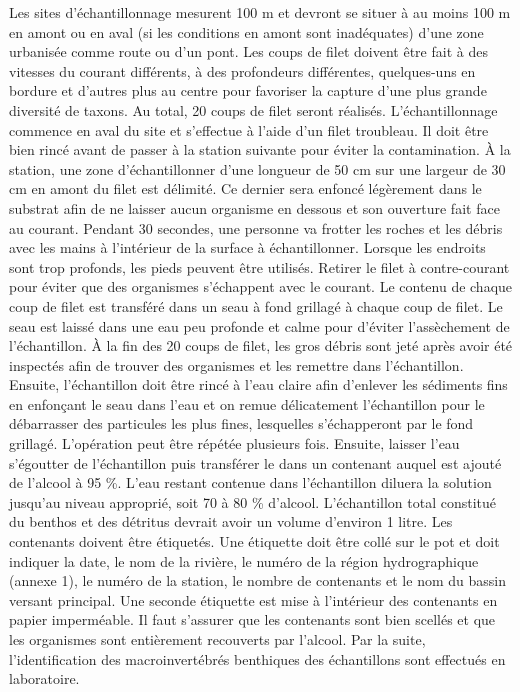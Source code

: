 \documentclass[]{glossa}
\begin{document}
Les sites d'échantillonnage mesurent 100 m et devront se situer à au
moins 100 m en amont ou en aval (si les conditions en amont sont
inadéquates) d'une zone urbanisée comme route ou d'un pont. Les coups de
filet doivent être fait à des vitesses du courant différents, à des
profondeurs différentes, quelques-uns en bordure et d'autres plus au
centre pour favoriser la capture d'une plus grande diversité de taxons.
Au total, 20 coups de filet seront réalisés. L'échantillonnage commence
en aval du site et s'effectue à l'aide d'un filet troubleau. Il doit
être bien rincé avant de passer à la station suivante pour éviter la
contamination. À la station, une zone d'échantillonner d'une longueur de
50 cm sur une largeur de 30 cm en amont du filet est délimité. Ce
dernier sera enfoncé légèrement dans le substrat afin de ne laisser
aucun organisme en dessous et son ouverture fait face au courant.
Pendant 30 secondes, une personne va frotter les roches et les débris
avec les mains à l'intérieur de la surface à échantillonner. Lorsque les
endroits sont trop profonds, les pieds peuvent être utilisés. Retirer le
filet à contre-courant pour éviter que des organismes s'échappent avec
le courant. Le contenu de chaque coup de filet est transféré dans un
seau à fond grillagé à chaque coup de filet. Le seau est laissé dans une
eau peu profonde et calme pour d'éviter l'assèchement de l'échantillon.
À la fin des 20 coups de filet, les gros débris sont jeté après avoir
été inspectés afin de trouver des organismes et les remettre dans
l'échantillon. Ensuite, l'échantillon doit être rincé à l'eau claire
afin d'enlever les sédiments fins en enfonçant le seau dans l'eau et on
remue délicatement l'échantillon pour le débarrasser des particules les
plus fines, lesquelles s'échapperont par le fond grillagé. L'opération
peut être répétée plusieurs fois. Ensuite, laisser l'eau s'égoutter de
l'échantillon puis transférer le dans un contenant auquel est ajouté de
l'alcool à 95 \%. L'eau restant contenue dans l'échantillon diluera la
solution jusqu'au niveau approprié, soit 70 à 80 \% d'alcool.
L'échantillon total constitué du benthos et des détritus devrait avoir
un volume d'environ 1 litre. Les contenants doivent être étiquetés. Une
étiquette doit être collé sur le pot et doit indiquer la date, le nom de
la rivière, le numéro de la région hydrographique (annexe 1), le numéro
de la station, le nombre de contenants et le nom du bassin versant
principal. Une seconde étiquette est mise à l'intérieur des contenants
en papier imperméable. Il faut s'assurer que les contenants sont bien
scellés et que les organismes sont entièrement recouverts par l'alcool.
Par la suite, l'identification des macroinvertébrés benthiques des
échantillons sont effectués en laboratoire.
\end{document}
